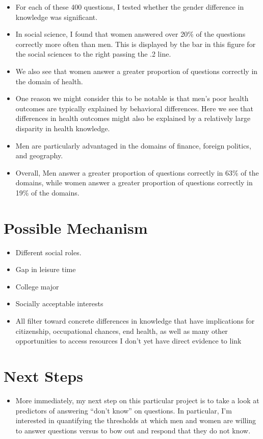 \documentclass[]{article}
\begin{document}
\begin{itemize}
  \item{For each of these 400 questions, I tested whether the gender difference in knowledge was significant.}
  \item{In social science, I found that women answered over 20\% of the questions correctly more often than men. This is displayed by the bar in this figure for the social sciences to the right passing the .2 line.}
  \item{We also see that women answer a greater proportion of questions correctly in the domain of health.}
  \item{One reason we might consider this to be notable is that men's poor health outcomes are typically explained by behavioral differences. Here we see that differences in health outcomes might also be explained by a relatively large disparity in health knowledge.}
  \item{Men are particularly advantaged in the domains of finance, foreign politics, and geography.}
  \item{Overall, Men answer a greater proportion of questions correctly in 63\% of the domains, while women answer a greater proportion of questions correctly in 19\% of the domains.}
\end{itemize}

\newpage
\section{Possible Mechanism}

\begin{itemize}
  \item{Different social roles.}
  \item{Gap in leisure time}
  \item{College major}
  \item{Socially acceptable interests}
  \item{All filter toward concrete differences in knowledge that have implications for citizenship, occupational chances, end health, as well as many other opportunities to access resources I don't yet have direct evidence to link}
\end{itemize}

\section{Next Steps}

\begin{itemize}
  \item{More immediately, my next step on this particular project is to take a look at predictors of answering ``don't know'' on questions. In particular, I'm interested in quantifying the thresholds at which men and women are willing to answer questions versus to bow out and respond that they do not know.}
\end{itemize}
\end{document}
